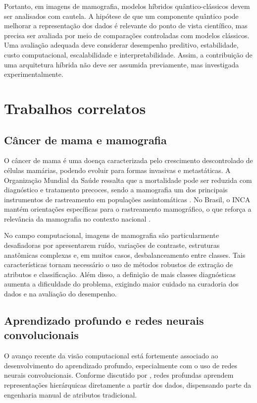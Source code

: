 \documentclass[
    12pt,
    openright,
    oneside,
    a4paper,
    english,
    brazil
]{abntex2}
\begin{document}
Portanto, em imagens de mamografia, modelos híbridos quântico-clássicos devem ser analisados com cautela. A hipótese de que um componente quântico pode melhorar a representação dos dados é relevante do ponto de vista científico, mas precisa ser avaliada por meio de comparações controladas com modelos clássicos. Uma avaliação adequada deve considerar desempenho preditivo, estabilidade, custo computacional, escalabilidade e interpretabilidade. Assim, a contribuição de uma arquitetura híbrida não deve ser assumida previamente, mas investigada experimentalmente.

\section{Trabalhos correlatos}

\subsection{Câncer de mama e mamografia}

O câncer de mama é uma doença caracterizada pelo crescimento descontrolado de células mamárias, podendo evoluir para formas invasivas e metastáticas. A Organização Mundial da Saúde ressalta que a mortalidade pode ser reduzida com diagnóstico e tratamento precoces, sendo a mamografia um dos principais instrumentos de rastreamento em populações assintomáticas \cite{WHO2025BreastCancer}. No Brasil, o INCA mantém orientações específicas para o rastreamento mamográfico, o que reforça a relevância da mamografia no contexto nacional \cite{INCA2025Rastreamento}.

No campo computacional, imagens de mamografia são particularmente desafiadoras por apresentarem ruído, variações de contraste, estruturas anatômicas complexas e, em muitos casos, desbalanceamento entre classes. Tais características tornam necessário o uso de métodos robustos de extração de atributos e classificação. Além disso, a definição de mais classes diagnósticas aumenta a dificuldade do problema, exigindo maior cuidado na curadoria dos dados e na avaliação do desempenho.

\subsection{Aprendizado profundo e redes neurais convolucionais}

O avanço recente da visão computacional está fortemente associado ao desenvolvimento do aprendizado profundo, especialmente com o uso de redes neurais convolucionais. Conforme discutido por , redes profundas aprendem representações hierárquicas diretamente a partir dos dados, dispensando parte da engenharia manual de atributos tradicional.
\end{document}
